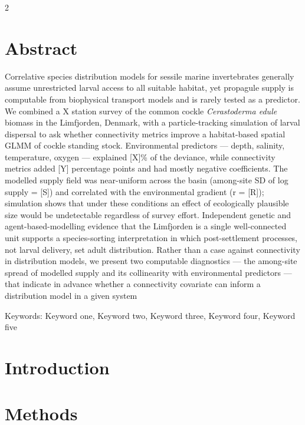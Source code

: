 \begin{spacing}{2}
\section{Abstract}
Correlative species distribution models for sessile marine invertebrates generally assume unrestricted larval access to all suitable habitat, yet propagule supply is computable from biophysical transport models and is rarely tested as a predictor. We combined a X station survey of the common cockle \textit{Cerastoderma edule} biomass in the Limfjorden, Denmark, with a particle-tracking simulation of larval dispersal to ask whether connectivity metrics improve a habitat-based spatial GLMM of cockle standing stock. Environmental predictors — depth, salinity, temperature, oxygen — explained [X]\% of the deviance, while connectivity metrics added [Y] percentage points and had mostly negative coefficients. The modelled supply field was near-uniform across the basin (among-site SD of log supply = [S]) and correlated with the environmental gradient (r = [R]); simulation shows that under these conditions an effect of ecologically plausible size would be undetectable regardless of survey effort. Independent genetic and agent-based-modelling evidence that the Limfjorden is a single well-connected unit supports a species-sorting interpretation in which post-settlement processes, not larval delivery, set adult distribution. Rather than a case against connectivity in distribution models, we present two computable diagnostics — the among-site spread of modelled supply and its collinearity with environmental predictors — that indicate in advance whether a connectivity covariate can inform a distribution model in a given system

\vspace*{\fill}
\noindent
Keywords:
Keyword one,
Keyword two,
Keyword three,
Keyword four,
Keyword five\\
\clearpage

\section{Introduction}

\section{Methods}


\end{spacing}
